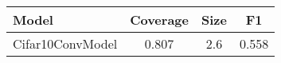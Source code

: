 \begin{table}[t] 
\centering 
\small 
\begin{tabular}{lccc} 
\toprule 
Model & Coverage & Size & F1 \\ 
\midrule 
Cifar10ConvModel & 0.807 & 2.6 & 0.558  \\ 
\bottomrule 
\end{tabular} 
\end{table} 
